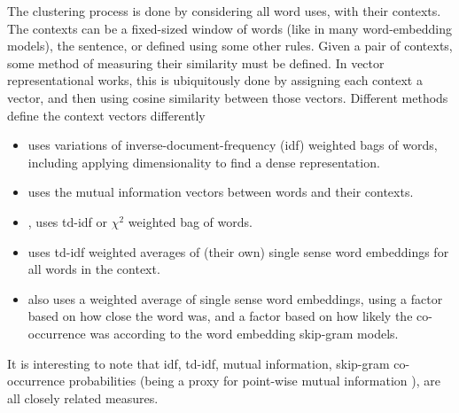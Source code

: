 \documentclass[12pt,parskip]{komatufte}
\begin{document}
The clustering process is done by considering all word uses, with their contexts.
The contexts can be a fixed-sized window of words (like in many word-embedding models), the sentence, or defined using some other rules.
Given a pair of contexts, some method of measuring their similarity must be defined.
In vector representational works, this is ubiquitously done by assigning each context a vector, and then using cosine similarity between those vectors.
Different methods define the context vectors differently
\begin{itemize}
\item \textcite{Schutze:1998wordsenseclustering} uses variations of inverse-document-frequency (idf) weighted bags of words, including applying dimensionality to find a dense representation.
\item \textcite{pantel2002WSI} uses the mutual information vectors between words and their contexts.
\item \textcite{Reisinger2010}, uses td-idf or $\chi^2$ weighted bag of words.
\item {} uses td-idf weighted averages of (their own) single sense word embeddings for all words in the context.
\item  {} also uses a weighted average of single sense word embeddings, using a factor based on how close the word was, and a factor based on how likely the co-occurrence was according to the word embedding skip-gram models.

\end{itemize}
It is interesting to note that idf, td-idf, mutual information, skip-gram co-occurrence probabilities (being a proxy for point-wise mutual information \parencite{levy2014neural}), are all closely related measures.
\end{document}
